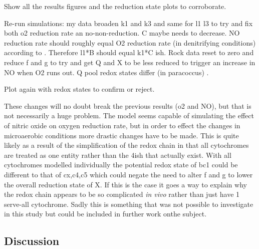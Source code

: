 Show all the results figures and the reduction state plots to corroborate.

Re-run simulations: my data broaden k1 and k3 and same for l1 l3 to try and fix both o2 reduction rate an no-non-reduction. C maybe needs to decrease. NO reduction rate should roughly equal O2 reduction rate (in denitrifying conditions) according to \citet{Rock2005}. Therefore l1*B should equal k1*C ish.
Rock data reset to zero and reduce f and g to try and get Q and X to be less reduced to trigger an increase in NO when O2 runs out. Q pool redox states differ (in paracoccus) \cite{Otten1999}.

Plot again with redox states to confirm or reject.

These changes will no doubt break the previous results (o2 and NO), but that is not necessarily a huge problem. The model seems capable of simulating the effect of nitric oxide on oxygen reduction rate, but in order to effect the changes in microaerobic conditions more drastic changes have to be made. This is quite likely as a result of the simplification of the redox chain in that all cytochromes are treated as one entity rather than the 4ish that actually exist. With all cytochromes modelled individually the potential redox state of bc1 could be different to that of cx,c4,c5 which could negate the need to alter f and g to lower the overall reduction state of X. If this is the case it goes a way to explain why the redox chain appears to be so complicated \textit{in vivo} rather than just have 1 serve-all cytochrome. Sadly this is something that was not possible to investigate in this study but could be included in further work onthe subject.

\subsection{Discussion}
